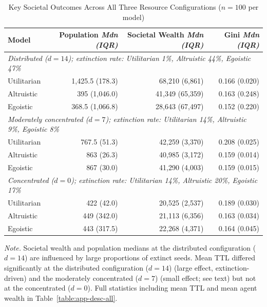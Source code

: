 \documentclass{icsthesis}
\begin{document}
\begin{mainmatter}
		\begin{table}[H]
		\vspace{2ex}
		\centering
		\caption{Key Societal Outcomes Across All Three Resource Configurations ($n = 100$ per model)}
		\label{table:desc-d7-d0}
		\footnotesize
		\renewcommand{\arraystretch}{1.3}
		\begin{tabular}{l r r r}
		\hline\hline
		\textbf{Model} & \textbf{Population} \textit{Mdn (IQR)} & \textbf{Societal Wealth} \textit{Mdn (IQR)} & \textbf{Gini} \textit{Mdn (IQR)} \\
		\hline
		\multicolumn{4}{l}{\textit{Distributed ($d = 14$); extinction rate: Utilitarian 1\%, Altruistic 44\%, Egoistic 47\%}} \\
		\hline
		Utilitarian & 1,425.5 (178.3)  & 68,210 (6,861)   & 0.166 (0.020) \\
		Altruistic  & 395 (1,046.0)    & 41,349 (65,359)  & 0.163 (0.248) \\
		Egoistic    & 368.5 (1,066.8)  & 28,643 (67,497)  & 0.152 (0.220) \\
		\hline
		\multicolumn{4}{l}{\textit{Moderately concentrated ($d = 7$); extinction rate: Utilitarian 14\%, Altruistic 9\%, Egoistic 8\%}} \\
		\hline
		Utilitarian & 767.5 (51.3) & 42,259 (3,370) & 0.208 (0.025) \\
		Altruistic  & 863 (26.3) & 40,985 (3,172) & 0.159 (0.014) \\
		Egoistic    & 867 (30.0) & 41,290 (4,003) & 0.159 (0.015) \\
		\hline
		\multicolumn{4}{l}{\textit{Concentrated ($d = 0$); extinction rate: Utilitarian 14\%, Altruistic 20\%, Egoistic 17\%}} \\
		\hline
		Utilitarian & 422 (42.0)   & 20,525 (2,537) & 0.189 (0.030) \\
		Altruistic  & 449 (342.0)  & 21,113 (6,356) & 0.163 (0.034) \\
		Egoistic    & 443 (317.5)  & 22,268 (4,371) & 0.164 (0.045) \\
		\hline
		\end{tabular}
		\par\smallskip
		{\footnotesize\noindent\textit{Note.} Societal wealth and population medians at the distributed configuration ($d = 14$) are influenced by large proportions of extinct seeds. Mean TTL differed significantly at the distributed configuration ($d = 14$) (large effect, extinction-driven) and the moderately concentrated ($d = 7$) (small effect; see text) but not at the concentrated ($d = 0$). Full statistics including mean TTL and mean agent wealth in Table~\ref{table:app-desc-all}.}
		\end{table}


\end{mainmatter}
\end{document}
